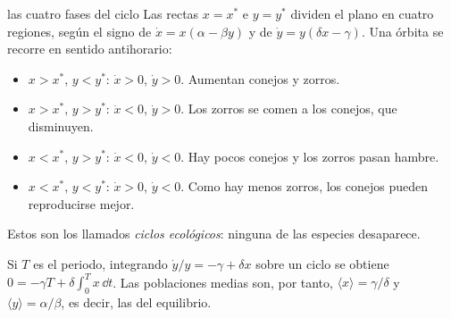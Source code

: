 \documentclass[11pt,twoside]{article}
\begin{document}
\begin{desarrollo}{las cuatro fases del ciclo}
Las rectas $x=x^*$ e $y=y^*$ dividen el plano en cuatro regiones, según el signo de $\dot x=x(\alpha-\beta y)$ y de
$\dot y=y(\delta x-\gamma)$. Una órbita se recorre en sentido antihorario:
\begin{itemize}
\item[\textbf{(I)}] $x>x^*$, $y<y^*$: $\dot x>0$, $\dot y>0$. Aumentan conejos y zorros.
\item[\textbf{(II)}] $x>x^*$, $y>y^*$: $\dot x<0$, $\dot y>0$. Los zorros se comen a los conejos, que disminuyen.
\item[\textbf{(III)}] $x<x^*$, $y>y^*$: $\dot x<0$, $\dot y<0$. Hay pocos conejos y los zorros pasan hambre.
\item[\textbf{(IV)}] $x<x^*$, $y<y^*$: $\dot x>0$, $\dot y<0$. Como hay menos zorros, los conejos pueden reproducirse mejor.
\end{itemize}
Estos son los llamados \emph{ciclos ecológicos}: ninguna de las especies desaparece.
\end{desarrollo}

\begin{observacion}
Si $T$ es el periodo, integrando $\dot y/y=-\gamma+\delta x$ sobre un ciclo se obtiene $0=-\gamma T+\delta\int_0^Tx\,\dd t$.
Las poblaciones medias son, por tanto, $\langle x\rangle=\gamma/\delta$ y $\langle y\rangle=\alpha/\beta$, es decir, las del equilibrio.
\end{observacion}
\end{document}
